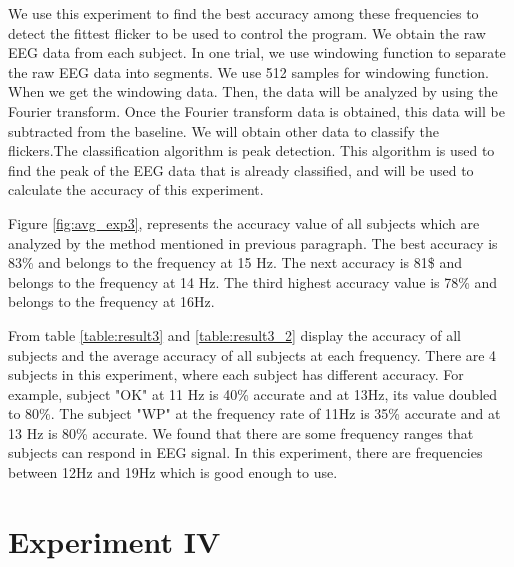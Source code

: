 We use this experiment to find the best accuracy among these frequencies to detect the fittest flicker to be used to control the program. We obtain the raw EEG data from each subject. In one trial, we use windowing function to separate the raw EEG data into segments. We use 512 samples for windowing function. When we get the windowing data. Then, the data will be analyzed by using the Fourier transform. Once the Fourier transform data is obtained, this data will be subtracted from the baseline. We will obtain other data to classify the flickers.The classification algorithm is peak detection. This algorithm is used to find the peak of the EEG data that is already classified, and will be used to calculate the accuracy of this experiment.


Figure \ref{fig:avg_exp3}, represents the accuracy value of all subjects which are analyzed by the method mentioned in previous paragraph. The best accuracy is 83\% and belongs to the frequency at 15 Hz. The next accuracy is 81\$ and belongs to the frequency at 14 Hz. The third highest accuracy value is 78\% and belongs to the frequency at 16Hz.

\newpage
From table \ref{table:result3} and \ref{table:result3_2} display the accuracy of all subjects and the average accuracy of all subjects at each frequency. There are 4 subjects in this experiment, where each subject has different accuracy. For example, subject "OK" at 11 Hz is 40\% accurate and at 13Hz, its value doubled to 80\%. The subject "WP" at the frequency rate of 11Hz is 35\% accurate and at 13 Hz is 80\% accurate. We found that there are some frequency ranges that subjects can respond in EEG signal. In this experiment, there are frequencies between 12Hz and 19Hz which is good enough to use.

\newpage
\section{Experiment IV}
